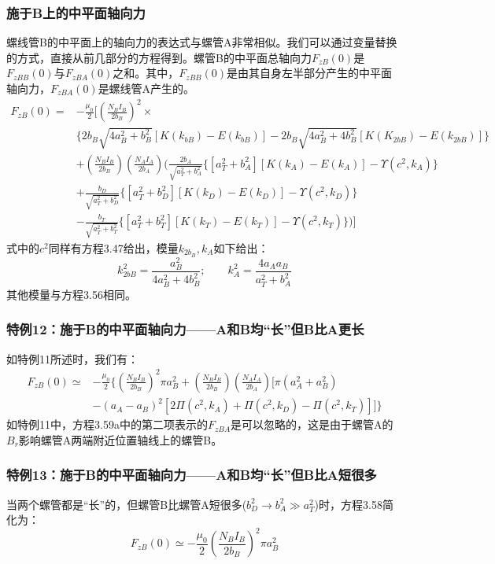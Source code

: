 \subsubsection{施于B上的中平面轴向力}
螺线管B的中平面上的轴向力的表达式与螺管A非常相似。我们可以通过变量替换的方式，直接从前几部分的方程得到。螺管B的中平面总轴向力$F_{zB}(0)$是$F_{zBB}(0)$与$F_{zBA}(0)$之和。其中，$F_{zBB}(0)$是由其自身左半部分产生的中平面轴向力，$F_{zBA}(0)$是螺线管A产生的。
\begin{equation}
\begin{split}
F_{zB}(0)=&-\frac{\mu_0}{2}[(\frac{N_BI_B}{2b_B})^2\times\\
&\{2b_B\sqrt{4a_B^2+b_B^2}[K(k_{bB})-E(k_{bB})]-2b_B\sqrt{4a_B^2+4b_B^2}[K(K_{2bB})-E(k_{2bB})]\}\\
&+(\frac{N_BI_B}{2b_B})(\frac{N_AI_A}{2b_A})(\frac{2b_A}{\sqrt{a_T^2+b_A^2}}\{[a_T^2+b_A^2][K(k_A)-E(k_A)]-\Upsilon(c^2,k_A)\}\\
&+\frac{b_D}{\sqrt{a_T^2+b_D^2}}\{[a_T^2+b_D^2][K(k_D)-E(k_D)]-\Upsilon(c^2,k_D)\}\\
&-\frac{b_T}{\sqrt{a_T^2+b_T^2}}\{[a_T^2+b_T^2][K(k_T)-E(k_T)]-\Upsilon(c^2,k_T)\})]
\end{split}
\end{equation}
式中的$c^2$同样有方程3.47给出，模量$k_{2b_B},k_A$如下给出：
\begin{equation}
k_{2bB}^2=\frac{a_B^2}{4a_B^2+4b_B^2};\quad \quad k_A^2=\frac{4a_Aa_B}{a_T^2+b_A^2}
\end{equation}
其他模量与方程3.56相同。

\subsubsection{特例12：施于B的中平面轴向力——A和B均“长”但B比A更长}
如特例11所述时，我们有：
\begin{equation}
\begin{split}
F_{zB}(0)\simeq&-\frac{\mu_0}{2}\{(\frac{N_BI_B}{2b_B})^2\pi a_B^2+(\frac {N_BI_B}{2b_B})(\frac{N_AI_A}{2b_A})[\pi(a_A^2+a_B^2)\\
&-(a_A-a_B)^2[2\Pi(c^2,k_A)+\Pi(c^2,k_D)-\Pi(c^2,k_T)]]\}
\end{split}
\end{equation}
如特例11中，方程3.59a中的第二项表示的$F_{zBA}$是可以忽略的，这是由于螺管A的$B_r$影响螺管A两端附近位置轴线上的螺管B。

\subsubsection{特例13：施于B的中平面轴向力——A和B均“长”但B比A短很多}
当两个螺管都是“长”的，但螺管B比螺管A短很多($b_D^2\rightarrow b_A^2\gg a_T^2$)时，方程3.58简化为：
\begin{equation}
F_{zB}(0)\simeq-\frac{\mu_0}{2}(\frac{N_BI_B}{2b_B})^2\pi a_B^2
\end{equation}

